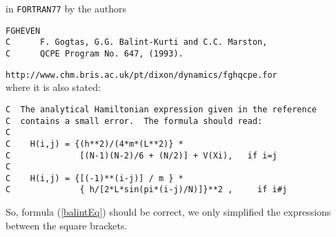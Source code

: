 \documentclass[12pt,a4paper]{article}
\begin{document}
in {\tt FORTRAN77} by the authors
\begin{verbatim}
FGHEVEN 
C      F. Gogtas, G.G. Balint-Kurti and C.C. Marston,
C      QCPE Program No. 647, (1993).
\end{verbatim}
{\small\tt http://www.chm.bris.ac.uk/pt/dixon/dynamics/fghqcpe.for} \\
where it is also stated:
\begin{verbatim}
C  The analytical Hamiltonian expression given in the reference
C  contains a small error.  The formula should read: 
C
C    H(i,j) = {(h**2)/(4*m*(L**2)} *
C              [(N-1)(N-2)/6 + (N/2)] + V(Xi),   if i=j
C
C    H(i,j) = {[(-1)**(i-j)] / m } *
C              { h/[2*L*sin(pi*(i-j)/N)]}**2 ,     if i#j
\end{verbatim}
So, formula (\ref{balintEq}) should be correct, we only simplified the 
expressions between the square brackets.
\end{document}
